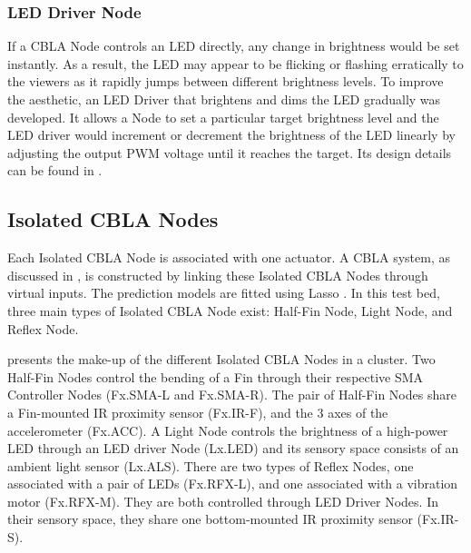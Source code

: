 \subsubsection{LED Driver Node}

If a CBLA Node controls an LED directly, any change in brightness would be set instantly. As a result, the LED may appear to be flicking or flashing erratically to the viewers as it rapidly jumps between different brightness levels. To improve the aesthetic, an LED Driver that brightens and dims the LED gradually was developed. It allows a Node to set a particular target brightness level and the LED driver would increment or decrement the brightness of the LED linearly by adjusting the output PWM voltage until it reaches the target. Its design details can be found in .

  
\subsection{Isolated CBLA Nodes}\label{sec:isolated-cbla-node}

Each Isolated CBLA Node is associated with one actuator. A CBLA system, as discussed in , is constructed by linking these Isolated CBLA Nodes through virtual inputs. The prediction models are fitted using Lasso \cite{Tibshirani1996}. In this test bed, three main types of Isolated CBLA Node exist: Half-Fin Node, Light Node, and Reflex Node.

 presents the make-up of the different Isolated CBLA Nodes in a cluster. Two Half-Fin Nodes control the bending of a Fin through their respective SMA Controller Nodes (Fx.SMA-L and Fx.SMA-R). The pair of Half-Fin Nodes share a Fin-mounted IR proximity sensor (Fx.IR-F), and the 3 axes of the accelerometer (Fx.ACC). A Light Node controls the brightness of a high-power LED through an LED driver Node (Lx.LED) and its sensory space consists of an ambient light sensor (Lx.ALS). There are two types of Reflex Nodes, one associated with a pair of LEDs (Fx.RFX-L), and one associated with a vibration motor (Fx.RFX-M). They are both controlled through LED Driver Nodes. In their sensory space, they share one bottom-mounted IR proximity sensor (Fx.IR-S). 

